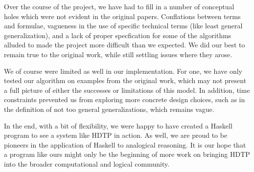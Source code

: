 \documentclass[12pt,a4paper]{article}
\begin{document}
Over the course of the project, we have had to fill in a number of conceptual holes which were not evident in the original papers. Conflations between terms and formulae, vagueness in the use of specific technical terms (like least general generalization), and a lack of proper specfication for some of the algorithms alluded to made the project more difficult than we expected. We did our best to remain true to the original work, while still settling issues where they arose.

We of course were limited as well in our implementation. For one, we have only tested our algorithm on examples from the original work, which may not present a full picture of either the successes or limitations of this model. In addition, time constraints prevented us from exploring more concrete design choices, such as in the definition of not too general generalizations, which remains vague.

In the end, with a bit of flexibility, we were happy to have created a Haskell program to see a system like HDTP in action. As well, we are proud to be pioneers in the application of Haskell to analogical reasoning. It is our hope that a program like ours might only be the beginning of more work on bringing HDTP into the broader computational and logical community.


% 





\end{document}
